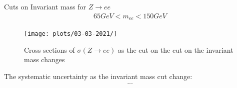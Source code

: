 Cuts on Invariant mass for $Z \rightarrow ee$
\begin{align}
    65 GeV < m_{ee} < 150 GeV
\end{align}


\begin{figure}[h!]
    \centering
	\texttt{[image: plots/03-03-2021/]}
    \caption{Cross sections of $\sigma (Z \rightarrow ee)$ as the cut on the cut on the invariant mass changes}
    \label{fig:13:00_03-03-21}
\end{figure}
The systematic uncertainty as the invariant mass cut change:
\begin{align}
    ...
\end{align}


